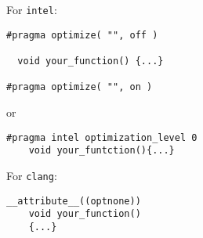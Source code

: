 \documentclass[10pt, a4paper, english, parskip, twocolumn]{scrartcl}
\newcommand{\code}[1]{\texttt{#1}}
\begin{document}
For \code{intel}:
\begin{lstlisting}[belowskip=-0.8 \baselineskip]
#pragma optimize( "", off )

  void your_function() {...}

#pragma optimize( "", on )
\end{lstlisting}
\quad\quad or
\begin{lstlisting}[belowskip=-0.8 \baselineskip]
#pragma intel optimization_level 0
	void your_funtction(){...}
\end{lstlisting}
%

For \code{clang}:
\begin{lstlisting}[belowskip=-0.8 \baselineskip]
__attribute__((optnone))
	void your_function()
    {...}
\end{lstlisting}
\end{document}
